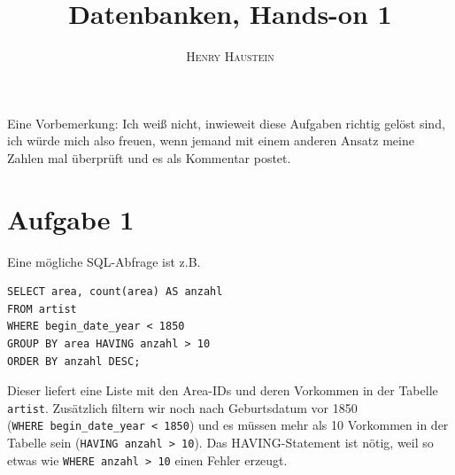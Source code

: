 \documentclass{article}
\title{\textbf{Datenbanken, Hands-on 1}}
\author{\textsc{Henry Haustein}}
\date{}
\begin{document}
	\maketitle
	
	Eine Vorbemerkung: Ich weiß nicht, inwieweit diese Aufgaben richtig gelöst sind, ich würde mich also freuen, wenn jemand mit einem anderen Ansatz meine Zahlen mal überprüft und es als Kommentar postet.
	
	\section*{Aufgabe 1}
	Eine mögliche SQL-Abfrage ist z.B.
	\begin{lstlisting}[style=sql]
SELECT area, count(area) AS anzahl 
FROM artist 
WHERE begin_date_year < 1850 
GROUP BY area HAVING anzahl > 10 
ORDER BY anzahl DESC;
	\end{lstlisting}
	Dieser liefert eine Liste mit den Area-IDs und deren Vorkommen in der Tabelle \texttt{artist}. Zusätzlich filtern wir noch nach Geburtsdatum vor 1850 (\texttt{WHERE\ begin\_date\_year < 1850}) und es müssen mehr als 10 Vorkommen in der Tabelle sein (\texttt{HAVING anzahl > 10}). Das HAVING-Statement ist nötig, weil so etwas wie \texttt{WHERE anzahl > 10} einen Fehler erzeugt.
	
\end{document}
